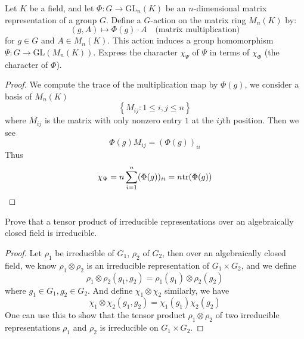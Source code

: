 \begin{prob}[S2011-Q5]
    Let \( K \) be a field, and let \( \Phi \colon G \to \mathrm{GL}_n(K) \) be an \( n \)-dimensional matrix representation of a group \( G \). Define a \( G \)-action on the matrix ring \( M_n(K) \) by:
\[
(g, A) \mapsto \Phi(g) \cdot A \quad \text{(matrix multiplication)}
\]
for \( g \in G \) and \( A \in M_n(K) \). This action induces a group homomorphism \( \Psi \colon G \to \mathrm{GL}(M_n(K)) \). Express the character \( \chi_\Psi \) of \( \Psi \) in terms of \( \chi_\Phi \) (the character of \( \Phi \)).
\end{prob}
\begin{proof}
    We compute the trace of the multiplication map by $\Phi(g)$, we consider a basis of $M_n(K)$ 
    \begin{equation*}
        \left\{M_{ij}: 1\leq i,j\leq n\right\}
    \end{equation*}
    where $M_{ij}$ is the matrix with only nonzero entry $1$ at the $ij$th position. Then we see 
    \begin{equation*}
        \Phi(g)M_{ij}=(\Phi(g))_{ii}
    \end{equation*}
    Thus 
    \begin{equation*}
        \chi_\Psi=n\sum_{i=1}^n(\Phi(g))_{ii}=n\text{tr}(\Phi(g))
    \end{equation*}
\end{proof}

\begin{prob}[S2015-Q5]
    Prove that a tensor product of irreducible representations over an algebraically closed field is irreducible.
\end{prob}
\begin{proof}
    Let $\rho_1$ be irreducible of $G_1$, $\rho_2$ of $G_2$, then over an algebraically closed field, we know $\rho_1\otimes\rho_2$ is an irreducible representation of $G_1\times G_2$, and we define 
    \begin{equation*}
        \rho_1\otimes\rho_2(g_1,g_2)=\rho_1(g_1)\otimes\rho_2(g_2)
    \end{equation*}
    where $g_1\in G_1, g_2\in G_2$. And define $\chi_1\otimes\chi_2$ similarly, we have 
    \begin{equation*}
        \chi_1\otimes\chi_2(g_1,g_2)=\chi_1(g_1)\chi_2(g_2)
    \end{equation*}
    One can use this to show that the tensor product $\rho_1\otimes\rho_2$ of two irreducible representations $\rho_1$ and $\rho_2$ is irreducible on $G_1\times G_2$.
\end{proof}

